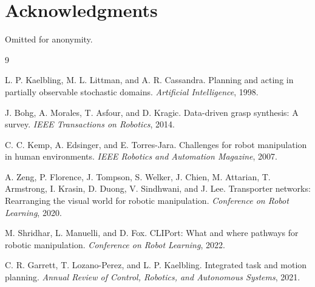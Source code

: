 \documentclass{article}
\begin{document}
\appendix
\renewcommand{\thesection}{\arabic{section}}


\section*{Acknowledgments}
Omitted for anonymity.

\begin{thebibliography}{9}

L. P. Kaelbling, M. L. Littman, and A. R. Cassandra.
\newblock Planning and acting in partially observable stochastic domains.
\newblock \emph{Artificial Intelligence}, 1998.

J. Bohg, A. Morales, T. Asfour, and D. Kragic.
\newblock Data-driven grasp synthesis: A survey.
\newblock \emph{IEEE Transactions on Robotics}, 2014.

C. C. Kemp, A. Edsinger, and E. Torres-Jara.
\newblock Challenges for robot manipulation in human environments.
\newblock \emph{IEEE Robotics and Automation Magazine}, 2007.

A. Zeng, P. Florence, J. Tompson, S. Welker, J. Chien, M. Attarian, T. Armstrong, I. Krasin, D. Duong, V. Sindhwani, and J. Lee.
\newblock Transporter networks: Rearranging the visual world for robotic manipulation.
\newblock \emph{Conference on Robot Learning}, 2020.

M. Shridhar, L. Manuelli, and D. Fox.
\newblock CLIPort: What and where pathways for robotic manipulation.
\newblock \emph{Conference on Robot Learning}, 2022.

C. R. Garrett, T. Lozano-Perez, and L. P. Kaelbling.
\newblock Integrated task and motion planning.
\newblock \emph{Annual Review of Control, Robotics, and Autonomous Systems}, 2021.

\end{thebibliography}
\end{document}
